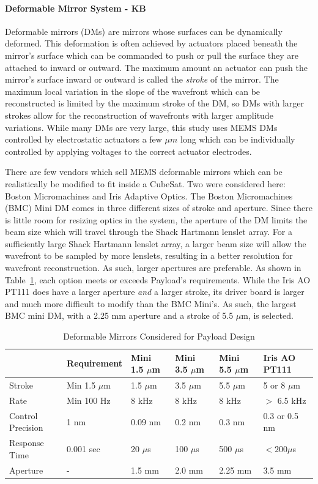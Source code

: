 \documentclass[12pt]{article}
\begin{document}
\paragraph{Deformable Mirror System - KB} \label{par:payload_dms}
Deformable mirrors (DMs) are mirrors whose surfaces can be dynamically deformed. This deformation is often achieved by actuators placed beneath the mirror's surface which can be commanded to push or pull the surface they are attached to inward or outward. The maximum amount an actuator can push the mirror's surface inward or outward is called the \emph{stroke} of the mirror. The maximum local variation in the slope of the wavefront which can be reconstructed is limited by the maximum stroke of the DM, so DMs with larger strokes allow for the reconstruction of wavefronts with larger amplitude variations. While many DMs are very large, this study uses MEMS DMs controlled by electrostatic actuators a few $\mu m$ long which can be individually controlled by applying voltages to the correct actuator electrodes.  

There are few vendors which sell MEMS deformable mirrors which can be realistically be modified to fit inside a CubeSat. Two were considered here: Boston Micromachines and Iris Adaptive Optics. The Boston Micromachines (BMC) Mini DM comes in three different sizes of stroke and aperture. Since there is little room for resizing optics in the system, the aperture of the DM limits the beam size which will travel through the Shack Hartmann lenslet array. For a sufficiently large Shack Hartmann lenslet array, a larger beam size will allow the wavefront to be sampled by more lenslets, resulting in a better resolution for wavefront reconstruction.  As such, larger apertures are preferable. As shown in Table~\ref{table:payload_dms}, each option meets or exceeds Payload's requirements. While the Iris AO PT111 does have a larger aperture \emph{and} a larger stroke, its driver board is larger and much more difficult to modify than the BMC Mini's. As such, the largest BMC mini DM, with a 2.25 mm aperture and a stroke of 5.5 $\mu \text{m}$, is selected.

\begin{table}[!ht]
  \caption{Deformable Mirrors Considered for Payload Design}
    \begin{tabular}{|l||l|llll|}
      \hline
     &Requirement&Mini 1.5 $\mu$m& Mini 3.5 $\mu$m & Mini 5.5 $\mu$m &Iris AO PT111 \\ \hline
    Stroke& Min 1.5 $\mu$m & 1.5 $\mu$m & 3.5 $\mu$m & 5.5 $\mu$m & 5 or 8 $\mu$m \\ \hline
    Rate& Min 100 Hz& 8 kHz & 8 kHz & 8 kHz & $>$ 6.5 kHz\\ \hline
    Control Precision& 1 nm & 0.09 nm& 0.2 nm & 0.3 nm & 0.3 or 0.5 nm \\ \hline
    Response Time& 0.001 sec & 20 $\mu$s & 100 $\mu$s & 500 $\mu$s& $< 200 \mu$s \\ \hline
    Aperture& - & 1.5 mm & 2.0 mm &2.25 mm&3.5 mm\\
      \hline
    \end{tabular}\label{table:payload_dms}
\end{table}
\end{document}
